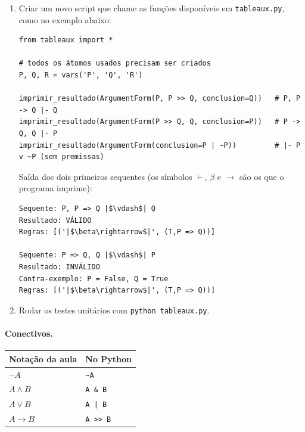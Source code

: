 \documentclass[12pt,a4paper]{article}
\begin{document}
\begin{enumerate}
    \item Criar um novo script que chame as funções disponíveis em \texttt{tableaux.py}, como no exemplo abaixo:

\begin{verbatim}
from tableaux import *

# todos os átomos usados precisam ser criados
P, Q, R = vars('P', 'Q', 'R')

imprimir_resultado(ArgumentForm(P, P >> Q, conclusion=Q))   # P, P -> Q |- Q
imprimir_resultado(ArgumentForm(P >> Q, Q, conclusion=P))   # P -> Q, Q |- P
imprimir_resultado(ArgumentForm(conclusion=P | ~P))         # |- P v ~P (sem premissas)
\end{verbatim}

    Saída dos dois primeiros sequentes (os símbolos $\vdash$, $\beta$ e $\rightarrow$ são os que o programa imprime):

\begin{verbatim}
Sequente: P, P => Q |$\vdash$| Q
Resultado: VÁLIDO
Regras: [('|$\beta\rightarrow$|', (T,P => Q))]

Sequente: P => Q, Q |$\vdash$| P
Resultado: INVÁLIDO
Contra-exemplo: P = False, Q = True
Regras: [('|$\beta\rightarrow$|', (T,P => Q))]
\end{verbatim}

    \item Rodar os testes unitários com \texttt{python tableaux.py}.
\end{enumerate}

\paragraph{Conectivos.}
\begin{table}[H]
\centering
\begin{tabular}{@{}ll@{}}
\toprule
\textbf{Notação da aula} & \textbf{No Python} \\
\midrule
$\neg A$ & \texttt{\textasciitilde A} \\
$A \wedge B$ & \texttt{A \& B} \\
$A \vee B$ & \texttt{A | B} \\
$A \rightarrow B$ & \texttt{A >> B} \\
\bottomrule
\end{tabular}
\end{table}
\end{document}
